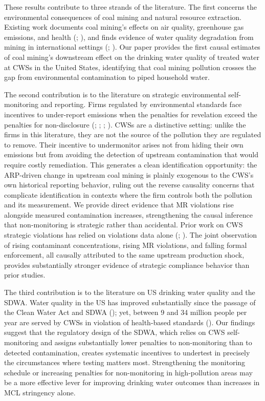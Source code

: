 \documentclass{article}
\begin{document}
These results contribute to three strands of the literature. The first concerns the environmental consequences of coal mining and natural resource extraction. Existing work documents coal mining's effects on air quality, greenhouse gas emissions, and health (\cite{muller2011environmental}; \cite{parfitt2024there}), and finds evidence of water quality degradation from mining in international settings (\cite{aragon2016polluting}; \cite{chu2023air}). Our paper provides the first causal estimates of coal mining's downstream effect on the drinking water quality of treated water at CWSs in the United States, identifying that coal mining pollution crosses the gap from environmental contamination to piped household water.

The second contribution is to the literature on strategic environmental self-monitoring and reporting. Firms regulated by environmental standards face incentives to under-report emissions when the penalties for revelation exceed the penalties for non-disclosure (\cite{duflo2013truth}; \cite{duflo2018value}; \cite{mu2024s}; \cite{helland1998enforcement}). CWSs are a distinctive setting: unlike the firms in this literature, they are not the source of the pollution they are regulated to remove. Their incentive to undermonitor arises not from hiding their own emissions but from avoiding the detection of upstream contamination that would require costly remediation. This generates a clean identification opportunity: the ARP-driven change in upstream coal mining is plainly exogenous to the CWS's own historical reporting behavior, ruling out the reverse causality concerns that complicate identification in contexts where the firm controls both the pollution and its measurement. We provide direct evidence that MR violations rise alongside measured contamination increases, strengthening the causal inference that non-monitoring is strategic rather than accidental. Prior work on CWS strategic violations has relied on violations data alone (\cite{wallsten2008effects}; \cite{foster2019arsenic}). The joint observation of rising contaminant concentrations, rising MR violations, and falling formal enforcement, all causally attributed to the same upstream production shock, provides substantially stronger evidence of strategic compliance behavior than prior studies.

The third contribution is to the literature on US drinking water quality and the SDWA. Water quality in the US has improved substantially since the passage of the Clean Water Act and SDWA (\cite{keiser2019consequences}); yet, between 9 and 34 million people per year are served by CWSs in violation of health-based standards (\cite{allaire2018national}). Our findings suggest that the regulatory design of the SDWA, which relies on CWS self-monitoring and assigns substantially lower penalties to non-monitoring than to detected contamination, creates systematic incentives to undertest in precisely the circumstances where testing matters most. Strengthening the monitoring schedule or increasing penalties for non-monitoring in high-pollution areas may be a more effective lever for improving drinking water outcomes than increases in MCL stringency alone.
\end{document}
